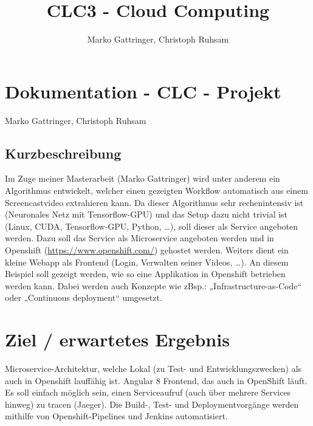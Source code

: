 \documentclass[11pt, a4paper, twoside]{article}   	%
\title{CLC3 - Cloud Computing}
\author{Marko Gattringer, Christoph Ruhsam}
\begin{document}
\setlength{\headheight}{15mm}

\section{Dokumentation - CLC - Projekt}
Marko Gattringer, Christoph Ruhsam

\subsection{Kurzbeschreibung}
Im Zuge meiner Masterarbeit (Marko Gattringer) wird unter anderem ein Algorithmus entwickelt, welcher einen gezeigten Workflow automatisch aus einem Screencastvideo extrahieren kann. Da dieser Algorithmus sehr rechenintensiv ist (Neuronales Netz mit Tensorflow-GPU) und das Setup dazu nicht trivial ist (Linux, CUDA, Tensorflow-GPU, Python, …), soll dieser als Service angeboten werden. Dazu soll das Service als Microservice angeboten werden und in Openshift (\href{https://www.openshift.com/}{https://www.openshift.com/}) gehostet werden. Weiters dient ein kleine Webapp als Frontend (Login, Verwalten seiner Videos, …). An diesem Beispiel soll gezeigt werden, wie so eine Applikation in Openshift betrieben werden kann. Dabei werden auch Konzepte wie zBsp.: „Infrastructure-as-Code“ oder „Continuous deployment“ umgesetzt.

\section{Ziel / erwartetes Ergebnis}
Microservice-Architektur, welche Lokal (zu Test- und Entwicklungszwecken) als auch in Openshift lauffähig ist.
Angular 8 Frontend, das auch in OpenShift läuft.
Es soll einfach möglich sein, einen Serviceaufruf (auch über mehrere Services hinweg) zu tracen (Jaeger).
Die Build-, Test- und Deploymentvorgänge werden mithilfe von Openshift-Pipelines und Jenkins automatisiert.
\end{document}
